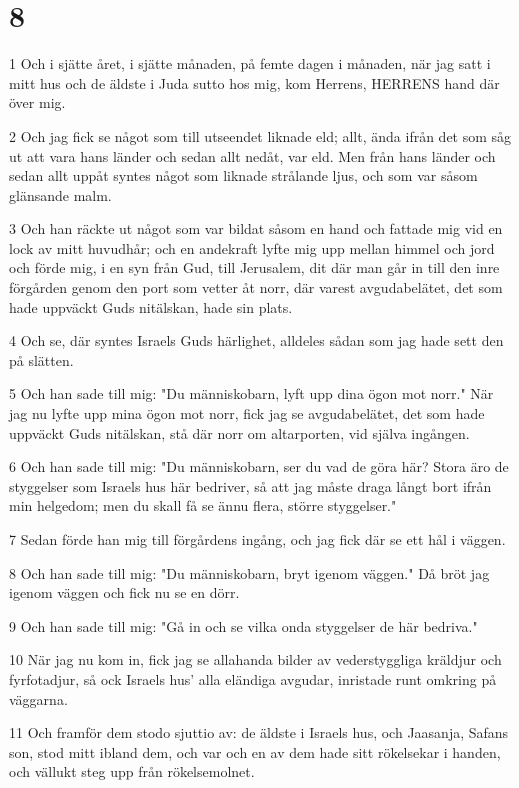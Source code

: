 \chapter{8}

\par 1 Och i sjätte året, i sjätte månaden, på femte dagen i månaden, när jag satt i mitt hus och de äldste i Juda sutto hos mig, kom Herrens, HERRENS hand där över mig.
\par 2 Och jag fick se något som till utseendet liknade eld; allt, ända ifrån det som såg ut att vara hans länder och sedan allt nedåt, var eld. Men från hans länder och sedan allt uppåt syntes något som liknade strålande ljus, och som var såsom glänsande malm.
\par 3 Och han räckte ut något som var bildat såsom en hand och fattade mig vid en lock av mitt huvudhår; och en andekraft lyfte mig upp mellan himmel och jord och förde mig, i en syn från Gud, till Jerusalem, dit där man går in till den inre förgården genom den port som vetter åt norr, där varest avgudabelätet, det som hade uppväckt Guds nitälskan, hade sin plats.
\par 4 Och se, där syntes Israels Guds härlighet, alldeles sådan som jag hade sett den på slätten.
\par 5 Och han sade till mig: "Du människobarn, lyft upp dina ögon mot norr." När jag nu lyfte upp mina ögon mot norr, fick jag se avgudabelätet, det som hade uppväckt Guds nitälskan, stå där norr om altarporten, vid själva ingången.
\par 6 Och han sade till mig: "Du människobarn, ser du vad de göra här? Stora äro de styggelser som Israels hus här bedriver, så att jag måste draga långt bort ifrån min helgedom; men du skall få se ännu flera, större styggelser."
\par 7 Sedan förde han mig till förgårdens ingång, och jag fick där se ett hål i väggen.
\par 8 Och han sade till mig: "Du människobarn, bryt igenom väggen." Då bröt jag igenom väggen och fick nu se en dörr.
\par 9 Och han sade till mig: "Gå in och se vilka onda styggelser de här bedriva."
\par 10 När jag nu kom in, fick jag se allahanda bilder av vederstyggliga kräldjur och fyrfotadjur, så ock Israels hus' alla eländiga avgudar, inristade runt omkring på väggarna.
\par 11 Och framför dem stodo sjuttio av: de äldste i Israels hus, och Jaasanja, Safans son, stod mitt ibland dem, och var och en av dem hade sitt rökelsekar i handen, och vällukt steg upp från rökelsemolnet.
